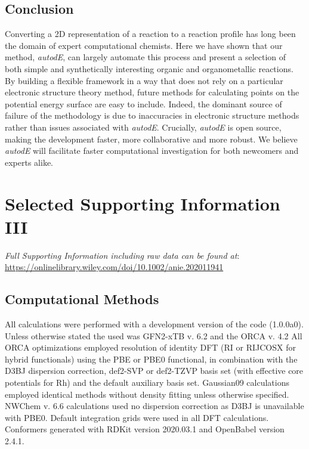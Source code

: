 \documentclass[../../main.tex]{subfiles}
\begin{document}
\subsection{Conclusion}

Converting a 2D representation of a reaction to a reaction profile has long been the domain of expert computational chemists. Here we have shown that our method, \emph{autodE}, can largely automate this process and present a selection of both simple and synthetically interesting organic and organometallic reactions. By building a flexible framework in a way that does not rely on a particular electronic structure theory method, future methods for calculating points on the potential energy surface are easy to include. Indeed, the dominant source of failure of the methodology is due to inaccuracies in electronic structure methods rather than issues associated with \emph{autodE}. Crucially, \emph{autodE} is open source, making the development faster, more collaborative and more robust. We believe \emph{autodE} will facilitate faster computational investigation for both newcomers and experts alike.


\clearpage

\section{Selected Supporting Information III}
\emph{Full Supporting Information including raw data can be found at}:\\ {\url{https://onlinelibrary.wiley.com/doi/10.1002/anie.202011941}}


\subsection{Computational Methods}

All \ade calculations were performed with a development version of the code (1.0.0a0). Unless otherwise stated the \lmethodx used was GFN2-xTB v. 6.2\cite{Bannwarth2019} and the \hmethodx ORCA v. 4.2\cite{Neese2017} All ORCA optimizations employed resolution of identity DFT (RI or RIJCOSX for hybrid functionals)\cite{Neese2003, Neese2009} using the PBE\cite{Perdew1996} or PBE0\cite{Adamo1999} functional, in combination with the D3BJ dispersion correction,\cite{Grimme2010, Grimme2011} def2-SVP or def2-TZVP basis set\cite{Weigend2005} (with effective core potentials for Rh) and the default auxiliary basis set.\cite{Weigend2006} Gaussian09\cite{G09} calculations employed identical methods without density fitting unless otherwise specified. NWChem v. 6.6\cite{Valiev2010} calculations used no dispersion correction as D3BJ is unavailable with PBE0. Default integration grids were used in all DFT calculations. Conformers generated with RDKit\cite{Landrum2019} version 2020.03.1 and OpenBabel version 2.4.1.
\end{document}

